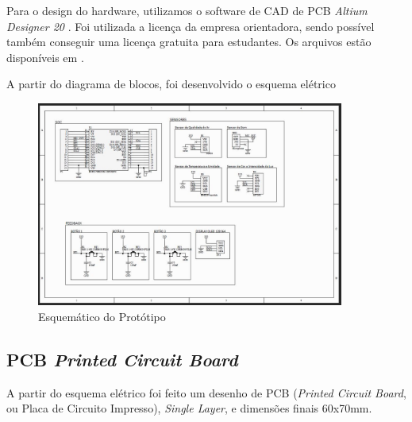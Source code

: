 \documentclass[../monografia.tex]{subfiles}
\begin{document}
Para o design do hardware, utilizamos o software de CAD de PCB \textit{Altium Designer 20} \cite{altium}. Foi utilizada a licença da empresa orientadora, sendo possível também conseguir uma licença gratuita para estudantes. Os arquivos estão disponíveis em \cite{git_hw}. 

A partir do diagrama de blocos, foi desenvolvido o esquema elétrico

\begin{figure}[h]
	\includegraphics[width=0.9\textwidth]{sch}
	\caption{Esquemático do Protótipo}
	\label{fig:img2}
\end{figure}

\subsection{PCB \textit{Printed Circuit Board}}

A partir do esquema elétrico foi feito um desenho de PCB (\textit{Printed Circuit Board}, ou Placa de Circuito Impresso), \textit{Single Layer}, e dimensões finais 60x70mm. 
\end{document}
